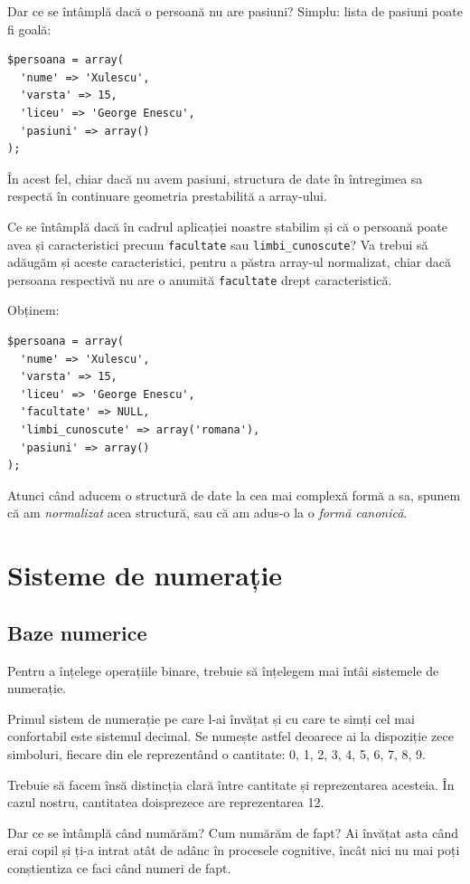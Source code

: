 Dar ce se întâmplă dacă o persoană nu are pasiuni? Simplu: lista de pasiuni
poate fi goală:
\begin{lstlisting}
$persoana = array(
  'nume' => 'Xulescu',
  'varsta' => 15,
  'liceu' => 'George Enescu',
  'pasiuni' => array()
);
\end{lstlisting}
În acest fel, chiar dacă nu avem pasiuni, structura de date în întregimea sa
respectă în continuare geometria prestabilită a array-ului.

Ce se întâmplă dacă în cadrul aplicației noastre stabilim și că
o persoană poate avea și caracteristici precum \texttt{facultate}
sau \texttt{limbi\_cunoscute}? Va trebui să adăugăm și aceste caracteristici,
pentru a păstra array-ul normalizat, chiar dacă persoana respectivă nu are
o anumită \texttt{facultate} drept caracteristică.

Obținem:
\begin{lstlisting}
$persoana = array(
  'nume' => 'Xulescu',
  'varsta' => 15,
  'liceu' => 'George Enescu',
  'facultate' => NULL,
  'limbi_cunoscute' => array('romana'),
  'pasiuni' => array()
);
\end{lstlisting}

Atunci când aducem o structură de date la cea mai complexă formă a sa,
spunem că am \textsl{normalizat} acea structură, sau că am adus-o la o \textsl{formă
canonică}.

\section{Sisteme de numerație}
\subsection{Baze numerice}
Pentru a înțelege operațiile binare, trebuie să înțelegem mai întâi sistemele
de numerație.

Primul sistem de numerație pe care l-ai învățat și cu care te simți cel
mai confortabil este sistemul decimal. Se numește astfel deoarece
ai la dispoziție zece simboluri, fiecare din ele reprezentând o cantitate:
0, 1, 2, 3, 4, 5, 6, 7, 8, 9.

Trebuie să facem însă distincția clară între cantitate și reprezentarea
acesteia. În cazul nostru, cantitatea doisprezece are reprezentarea 12.

Dar ce se întâmplă când numărăm? Cum numărăm de fapt? Ai învățat
asta când erai copil și ți-a intrat atât de adânc în procesele cognitive,
încât nici nu mai poți conștientiza ce faci când numeri de fapt.

